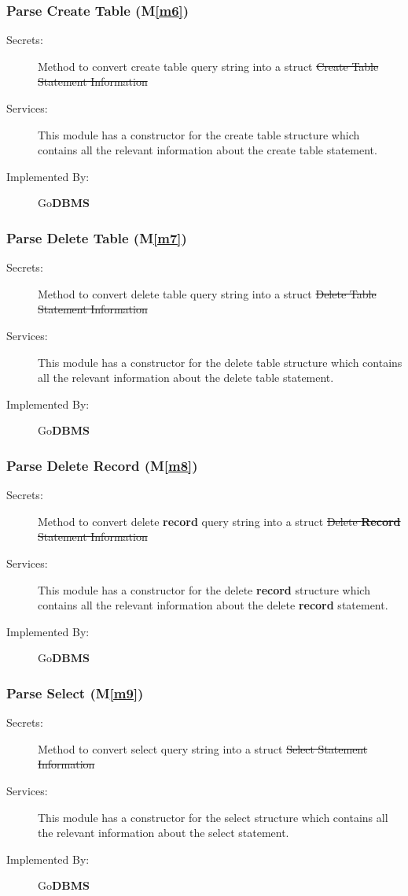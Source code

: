 \documentclass[12pt, titlepage]{article}
\newcommand{\mref}[1]{M\ref{#1}}
\begin{document}
\subsubsection{Parse Create Table (\mref{m6})}
\begin{description}
\item[Secrets:]{\color{red} Method to convert create table query string into a struct} \sout{Create Table Statement Information}
\item[Services:]This module has a constructor for the create table structure which contains all the relevant information about the create table statement.
\item[Implemented By:] Go\textbf{DBMS}
\end{description}

\subsubsection{Parse Delete Table (\mref{m7})}
\begin{description}
\item[Secrets:] {\color{red} Method to convert delete table query string into a struct} \sout{Delete Table Statement Information}
\item[Services:]This module has a constructor for the delete table structure which contains all the relevant information about the delete table statement.
\item[Implemented By:] Go\textbf{DBMS}
\end{description}

\subsubsection{Parse Delete \textbf{Record} (\mref{m8})}
\begin{description}
\item[Secrets:] {\color{red} Method to convert delete \textbf{record} query string into a struct} \sout{Delete \textbf{Record} Statement Information}
\item[Services:]This module has a constructor for the delete \textbf{record} structure which contains all the relevant information about the delete \textbf{record} statement.
\item[Implemented By:] Go\textbf{DBMS}
\end{description}

\subsubsection{Parse Select (\mref{m9})}
\begin{description}
\item[Secrets:] {\color{red} Method to convert select query string into a struct} \sout{Select Statement Information}
\item[Services:]This module has a constructor for the select structure which contains all the relevant information about the select statement.
\item[Implemented By:] Go\textbf{DBMS}
\end{description}
\end{document}

